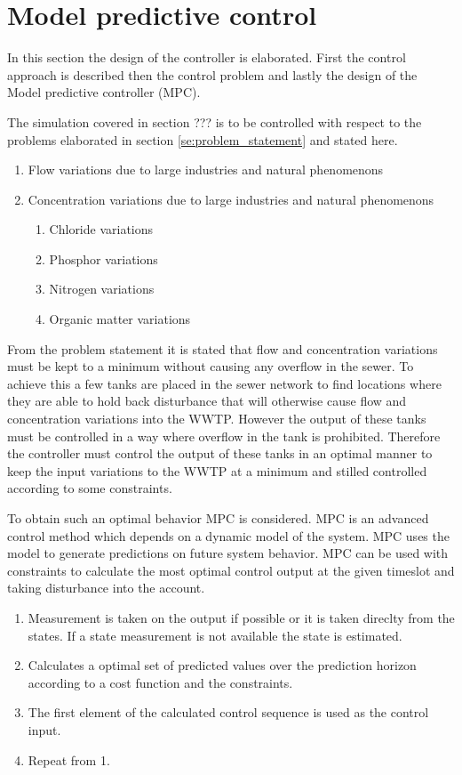 \section{Model predictive control}\label{se:model_predictive_control}
In this section the design of the controller is elaborated. First the control approach is described then the control problem and lastly the design of the Model predictive controller (MPC). 

The simulation covered in section ??? is to be controlled with respect to the problems elaborated in section \ref{se:problem_statement} and stated here. 
\begin{enumerate}
\item Flow variations due to large industries and natural phenomenons
\item Concentration variations due to large industries and natural phenomenons
\begin{enumerate}
	\item Chloride variations
	\item Phosphor variations
	\item Nitrogen variations
	\item Organic matter variations
\end{enumerate}
\end{enumerate}

From the problem statement it is stated that flow and concentration variations must be kept to a minimum without causing any overflow in the sewer. To achieve this a few tanks are placed in the sewer network to find locations where they are able to hold back disturbance that will otherwise cause flow and concentration variations into the WWTP. However the output of these tanks must be controlled in a way where overflow in the tank is prohibited. Therefore the controller must control the output of these tanks in an optimal manner to keep the input variations to the WWTP at a minimum and stilled controlled according to some constraints.

To obtain such an optimal behavior MPC is considered. MPC is an advanced control method which depends on a dynamic model of the system. MPC uses the model to generate predictions on future system behavior. MPC can be used with constraints to calculate the most optimal control output at the given timeslot and taking disturbance into the account. 

\begin{enumerate}
       	\item Measurement is taken on the output if possible or it is taken direclty from the states. If a state measurement is not available the state is estimated.
       	\item Calculates a optimal set of predicted values over the prediction horizon according to a cost function and the constraints.
       	\item The first element of the calculated control sequence is used as the control input.
       	\item Repeat from 1.
\end{enumerate}       

